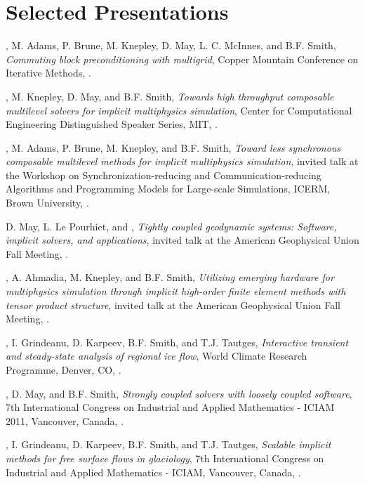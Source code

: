 \documentclass[10pt,letterpaper]{article}
\newcommand\ptitle[1]{\textit{#1}} %
\renewenvironment{itemize}{
  \begin{list}{}{
    \setlength{\leftmargin}{1.5em}
    \setlength{\itemsep}{0.25em}
    \setlength{\parskip}{0pt}
    \setlength{\parsep}{0.25em}
  }
}{
  \end{list}
}
\begin{document}
\section*{Selected Presentations}
\begin{itemize}
\item {\JedBrown}, M. Adams, P. Brune, M. Knepley, D. May, L. C. McInnes, and B.F. Smith, \ptitle{Commuting block preconditioning with multigrid}, Copper Mountain Conference on Iterative Methods, .
\item {\JedBrown}, M. Knepley, D. May, and B.F. Smith, \ptitle{Towards high throughput composable multilevel solvers for implicit multiphysics simulation}, Center for Computational Engineering Distinguished Speaker Series, MIT, .
\item {\JedBrown}, M. Adams, P. Brune, M. Knepley, and B.F. Smith, \ptitle{Toward less synchronous composable multilevel methods for implicit multiphysics simulation}, invited talk at the Workshop on Synchronization-reducing and Communication-reducing Algorithms and Programming Models for Large-scale Simulations, ICERM, Brown University, .
\item D. May, L. Le Pourhiet, and {\JedBrown}, \ptitle{Tightly coupled geodynamic systems: Software, implicit solvers, and applications}, invited talk at the American Geophysical Union Fall Meeting, .
\item {\JedBrown}, A. Ahmadia, M. Knepley, and B.F. Smith, \ptitle{Utilizing emerging hardware for multiphysics simulation through implicit high-order finite element methods with tensor product structure}, invited talk at the American Geophysical Union Fall Meeting, .
\item {\JedBrown}, I. Grindeanu, D. Karpeev, B.F. Smith, and T.J. Tautges, \ptitle{Interactive transient and steady-state analysis of regional ice flow}, World Climate Research Programme, Denver, CO, .
\item {\JedBrown}, D. May, and B.F. Smith, \ptitle{Strongly coupled solvers with loosely coupled software}, 7th International Congress on Industrial and Applied Mathematics - ICIAM 2011, Vancouver, Canada, .
\item {\JedBrown}, I. Grindeanu, D. Karpeev, B.F. Smith, and T.J. Tautges, \ptitle{Scalable implicit methods for free surface flows in glaciology}, 7th International Congress on Industrial and Applied Mathematics - ICIAM, Vancouver, Canada, .

\end{itemize}
\end{document}
